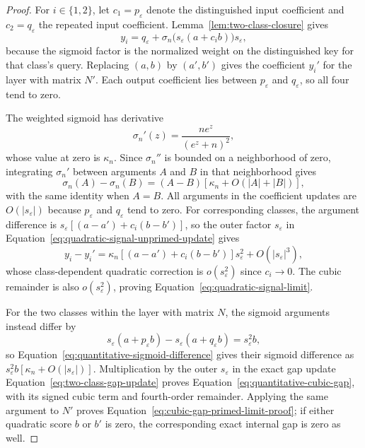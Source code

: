 \documentclass[mlmain]{jmlr}
\begin{document}
\begin{proof}
For $i\in\{1,2\}$, let $c_1=p_\varepsilon$ denote the distinguished input
coefficient and $c_2=q_\varepsilon$ the repeated input coefficient.
Lemma~\ref{lem:two-class-closure} gives
\begin{equation}
 y_i=q_\varepsilon+
       \sigma_n\!\bigl(s_\varepsilon(a+c_i b)\bigr)s_\varepsilon,
 \label{eq:quadratic-signal-unprimed-update}
\end{equation}
because the sigmoid factor is the normalized weight on the distinguished
key for that class's query.  Replacing $(a,b)$ by $(a',b')$ gives the
coefficient $y_i'$ for the layer with matrix $N'$.  Each output coefficient
lies between $p_\varepsilon$ and $q_\varepsilon$, so all four tend to zero.

The weighted sigmoid has derivative
\begin{equation}
 \sigma_n'(z)=\frac{ne^z}{(e^z+n)^2},
 \label{eq:quadratic-signal-sigmoid-derivative}
\end{equation}
whose value at zero is $\kappa_n$.  Since $\sigma_n''$ is bounded on a
neighborhood of zero, integrating $\sigma_n'$ between arguments $A$ and
$B$ in that neighborhood gives
\begin{equation}
 \sigma_n(A)-\sigma_n(B)
 =(A-B)\left[\kappa_n+O(|A|+|B|)\right],
 \label{eq:quantitative-sigmoid-difference}
\end{equation}
with the same identity when $A=B$.  All arguments in the coefficient
updates are $O(|s_\varepsilon|)$ because $p_\varepsilon$ and
$q_\varepsilon$ tend to zero.  For corresponding classes, the argument
difference is $s_\varepsilon[(a-a')+c_i(b-b')]$, so the outer factor
$s_\varepsilon$ in Equation~\eqref{eq:quadratic-signal-unprimed-update}
gives
\begin{equation}
 y_i-y_i'
 =\kappa_n[(a-a')+c_i(b-b')]s_\varepsilon^2
   +O(|s_\varepsilon|^3),
 \label{eq:quantitative-class-displacement}
\end{equation}
whose class-dependent quadratic correction is $o(s_\varepsilon^2)$ since
$c_i\to0$.  The cubic remainder is also $o(s_\varepsilon^2)$, proving
Equation~\eqref{eq:quadratic-signal-limit}.

For the two classes within the layer with matrix $N$, the sigmoid
arguments instead differ by
\begin{equation}
 s_\varepsilon(a+p_\varepsilon b)
 -s_\varepsilon(a+q_\varepsilon b)=s_\varepsilon^2b,
 \label{eq:cubic-gap-argument-difference}
\end{equation}
so Equation~\eqref{eq:quantitative-sigmoid-difference} gives their sigmoid
difference as $s_\varepsilon^2b[\kappa_n+O(|s_\varepsilon|)]$.
Multiplication by the outer $s_\varepsilon$ in the exact gap update
Equation~\eqref{eq:two-class-gap-update} proves
Equation~\eqref{eq:quantitative-cubic-gap}, with its signed cubic term and
fourth-order remainder.  Applying the same argument to $N'$ proves
Equation~\eqref{eq:cubic-gap-primed-limit-proof}; if either quadratic score
$b$ or $b'$ is zero, the corresponding exact internal gap is zero as well.
\end{proof}
\end{document}
